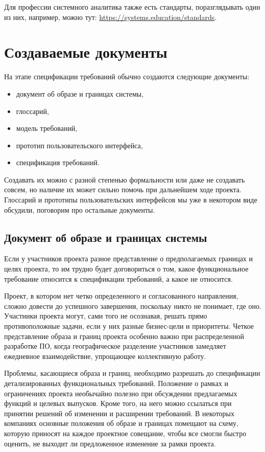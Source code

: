 \documentclass{../../text-style}
\begin{document}
Для профессии системного аналитика также есть стандарты, поразглядывать один из них, например, можно тут: \url{https://systems.education/standards}.

\section{Создаваемые документы}

На этапе спецификации требований обычно создаются следующие документы:

\begin{itemize}
    \item документ об образе и границах системы,
    \item глоссарий,
    \item модель требований,
    \item прототип пользовательского интерфейса,
    \item спецификация требований.
\end{itemize}

Создавать их можно с разной степенью формальности или даже не создавать совсем, но наличие их может сильно помочь при дальнейшем ходе проекта. Глоссарий и прототипы пользовательских интерфейсов мы уже в некотором виде обсудили, поговорим про остальные документы.

\subsection{Документ об образе и границах системы}

Если у участников проекта разное представление о предполагаемых границах и целях проекта, то им трудно будет договориться о том, какое функциональное требование относится к спецификации требований, а какое не относится.

Проект, в котором нет четко определенного и согласованного направления, сложно довести до успешного завершения, поскольку никто не понимает, где оно. Участники проекта могут, сами того не осознавая, решать прямо противоположные задачи, если у них разные бизнес-цели и приоритеты. Четкое представление образа и границ проекта особенно важно при распределенной разработке ПО, когда географическое разделение участников замедляет ежедневное взаимодействие, упрощающее коллективную работу.

Проблемы, касающиеся образа и границ, необходимо разрешать до спецификации детализированных функциональных требований. Положение о рамках и ограничениях проекта необычайно полезно при обсуждении предлагаемых функций и целевых выпусков. Кроме того, на него можно ссылаться при принятии решений об изменении и расширении требований. В некоторых компаниях основные положения об образе и границах помещают на схему, которую приносят на каждое проектное совещание, чтобы все смогли быстро оценить, не выходит ли предложенное изменение за рамки проекта.
\end{document}
